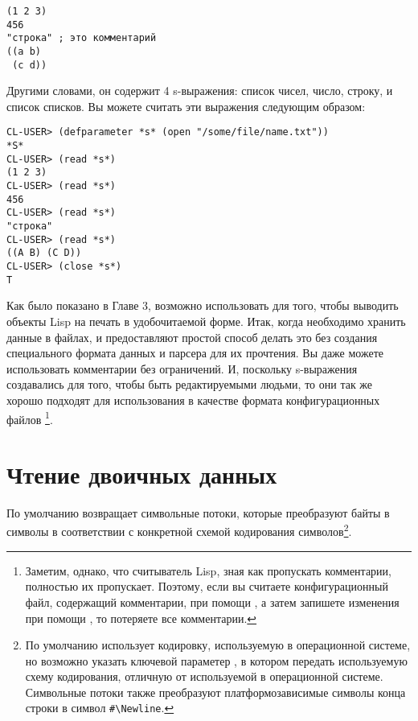 \begin{lstlisting}
(1 2 3)
456
"строка" ; это комментарий
((a b)
 (c d))
\end{lstlisting}

Другими словами, он содержит 4 s-выражения: список чисел, число, строку, и список
списков. Вы можете считать эти выражения следующим образом:

\begin{lstlisting}
CL-USER> (defparameter *s* (open "/some/file/name.txt"))
*S*
CL-USER> (read *s*)
(1 2 3)
CL-USER> (read *s*)
456
CL-USER> (read *s*)
"строка"
CL-USER> (read *s*)
((A B) (C D))
CL-USER> (close *s*)
T
\end{lstlisting}

Как было показано в Главе 3, возможно использовать  для того, чтобы выводить
объекты Lisp на печать в удобочитаемой форме. Итак, когда необходимо хранить данные в
файлах,  и  предоставляют простой способ делать это без создания
специального формата данных и парсера для их прочтения. Вы даже можете использовать
комментарии без ограничений. И, поскольку s-выражения создавались для того, чтобы быть
редактируемыми людьми, то они так же хорошо подходят для использования в качестве формата
конфигурационных файлов \footnote{Заметим, однако, что считыватель Lisp, зная как
  пропускать комментарии, полностью их пропускает. Поэтому, если вы считаете
  конфигурационный файл, содержащий комментарии, при помощи , а затем запишете
  изменения при помощи , то потеряете все комментарии.}.

\section{Чтение двоичных данных}

По умолчанию  возвращает символьные потоки, которые преобразуют байты в символы
в соответствии с конкретной схемой кодирования символов\footnote{По умолчанию 
  использует кодировку, используемую в операционной системе, но возможно указать ключевой
  параметер , в котором передать используемую схему кодирования,
  отличную от используемой в операционной системе. Символьные потоки также преобразуют
  платформозависимые символы конца строки в символ \lstinline!#\Newline!.}.

